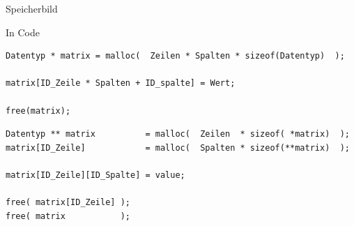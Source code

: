 \begin{frame}{Speicherbild}
\begin{tcolorbox}[title=Speicherbild (\texttt{char}{,} 2D)]
\end{tcolorbox}
%
\end{frame}


\begin{frame}[fragile]{In Code}
%
\begin{codebox}
\begin{verbatim}
Datentyp * matrix = malloc(  Zeilen * Spalten * sizeof(Datentyp)  );

matrix[ID_Zeile * Spalten + ID_spalte] = Wert;

free(matrix);
\end{verbatim}
\end{codebox}
%
\begin{codebox}
\begin{verbatim}
Datentyp ** matrix          = malloc(  Zeilen  * sizeof( *matrix)  );
matrix[ID_Zeile]            = malloc(  Spalten * sizeof(**matrix)  );

matrix[ID_Zeile][ID_Spalte] = value;

free( matrix[ID_Zeile] );
free( matrix           );
\end{verbatim}
\end{codebox}
%
\end{frame}


